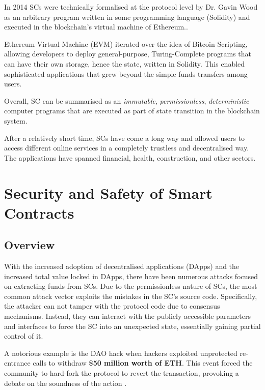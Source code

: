 \documentclass[oneside]{ecsproject}     %
\begin{document}
In 2014 SCs were technically formalised at the protocol level by Dr. Gavin Wood as an arbitrary program
written in some programming language (Solidity) and executed in the blockchain's virtual machine of Ethereum.\cite{eth_yellow_paper}.

Ethereum Virtual Machine (EVM) iterated over the idea of Bitcoin Scripting, allowing developers to deploy general-purpose, Turing-Complete
programs that can have their own storage, hence the state, written in Solidity\cite{solidity_docs}. This enabled sophisticated applications that grew beyond
the simple funds transfers among users.

Overall, SC can be summarised as an \textit{immutable}, \textit{permissionless}, \textit{deterministic} computer programs 
that are executed as part of state transition in the blockchain system. 

After a relatively short time, SCs have come a long way and allowed users to access different online services in a completely trustless and decentralised way.
The applications have spanned financial, health, construction\cite{cad_blockchain}, and other sectors. 

\chapter{Security and Safety of Smart Contracts}

\section{Overview}

With the increased adoption of decentralised applications (DApps) and the increased total value locked in DApps, 
there have been numerous attacks focused on extracting funds from SCs. 
Due to the permissionless nature of SCs, the most common attack vector exploits the mistakes in the SC's source code.
Specifically, the attacker can not tamper with the protocol code due to consensus mechanisms.
Instead, they can interact with the publicly accessible parameters and interfaces to force the SC into an unexpected state, essentially gaining partial control of it.

A notorious example is the DAO hack when hackers exploited unprotected re-entrance calls to withdraw \textbf{\$50 million worth of ETH}. 
This event forced the community to hard-fork the protocol to revert the transaction, provoking a debate on the soundness of the action \cite{the_dao}.
\end{document}
